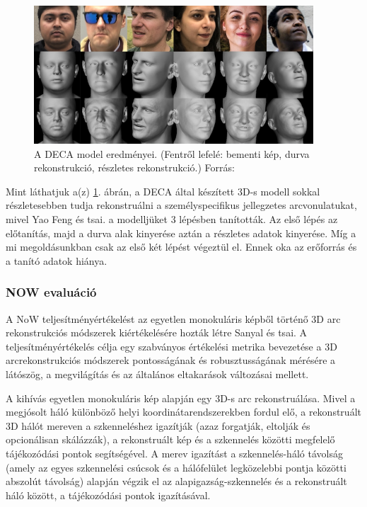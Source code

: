 \documentclass[12pt,a4]{article}
\begin{document}
             \begin{figure}[h]	
    		      \centering
    		      \includegraphics[width=1\linewidth]{deca_results2.png}
                \caption{A DECA model eredményei. (Fentről lefelé: bementi kép, durva rekonstrukció, részletes rekonstrukció.) Forrás: \cite{deca}}
                \label{fig:decavisres}
    	       \end{figure} 

            Mint láthatjuk a(z) \ref{fig:decavisres}. ábrán, a DECA által készített 3D-s modell sokkal részletesebben tudja rekonstruálni a személyspecifikus jellegzetes arcvonulatukat, mivel Yao Feng és tsai. a modelljüket 3 lépésben tanították. Az első lépés az előtanítás, majd a durva alak kinyerése aztán a részletes adatok kinyerése. Míg a mi megoldásunkban csak az első két lépést végeztül el. Ennek oka az erőforrás és a tanító adatok hiánya.
            
            \clearpage
            \subsubsection{NOW evaluáció}

            A NoW teljesítményértékelést az egyetlen monokuláris képből történő 3D arc rekonstrukciós módszerek kiértékelésére hozták létre \cite{now}Sanyal és tsai. A teljesítményértékelés célja egy szabványos értékelési metrika bevezetése a 3D arcrekonstrukciós módszerek pontosságának és robusztusságának mérésére a látószög, a megvilágítás és az általános eltakarások változásai mellett.

            A kihívás egyetlen monokuláris kép alapján egy 3D-s arc rekonstruálása. Mivel a megjósolt háló különböző helyi koordinátarendszerekben fordul elő, a rekonstruált 3D hálót mereven a szkenneléshez igazítják (azaz forgatják, eltolják és opcionálisan skálázzák), a rekonstruált kép és a szkennelés közötti megfelelő tájékozódási pontok segítségével. A merev igazítást a szkennelés-háló távolság (amely az egyes szkennelési csúcsok és a hálófelület legközelebbi pontja közötti abszolút távolság) alapján végzik el az alapigazság-szkennelés és a rekonstruált háló között, a tájékozódási pontok igazításával.
\end{document}
